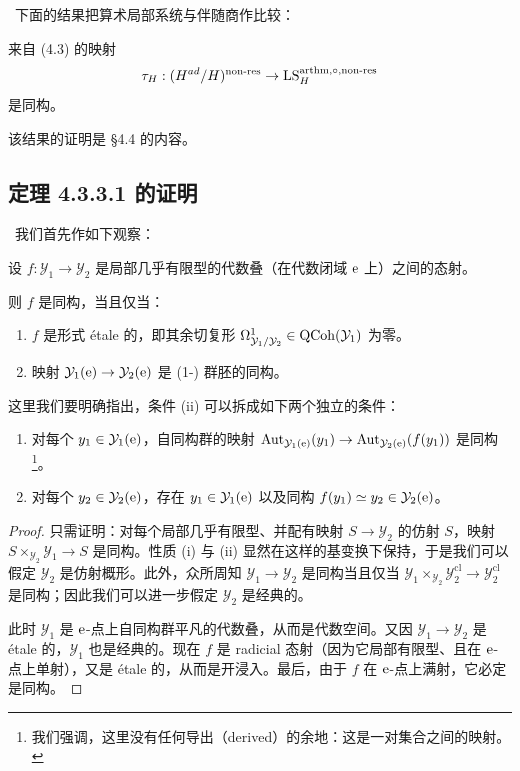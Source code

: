 \ 下面的结果把算术局部系统与伴随商作比较：

\begin{thm}
来自 (4.3) 的映射
\[
  \tau_H : (H^{ad}/H)^{\mathrm{non}\text{-}\mathrm{res}} \to \mathrm{LS}^{\mathrm{arthm},\circ,\mathrm{non}\text{-}\mathrm{res}}_H
\]
是同构。
\end{thm}

该结果的证明是 §4.4 的内容。

\subsection{定理 4.3.3.1 的证明}

\ 我们首先作如下观察：

\begin{lem}
设 $f : \mathcal{Y}_1 \to \mathcal{Y}_2$ 是局部几乎有限型的代数叠（在代数闭域 $\mathrm{e}$ 上）之间的态射。

则 $f$ 是同构，当且仅当：
\begin{enumerate}[label=(\roman*)]
  \item $f$ 是形式 étale 的，即其余切复形 $\Omega^1_{\mathcal{Y}_1/\mathcal{Y}_2} \in \mathrm{QCoh}(\mathcal{Y}_1)$ 为零。
  \item 映射 $\mathcal{Y}_1(\mathrm{e}) \to \mathcal{Y}_2(\mathrm{e})$ 是 (1-) 群胚的同构。
\end{enumerate}
这里我们要明确指出，条件 (ii) 可以拆成如下两个独立的条件：
\begin{enumerate}[label=(\text{ii}$_{\arabic*}$)]
  \item 对每个 $y_1 \in \mathcal{Y}_1(\mathrm{e})$，自同构群的映射 $\operatorname{Aut}_{\mathcal{Y}_1(\mathrm{e})}(y_1) \to \operatorname{Aut}_{\mathcal{Y}_2(\mathrm{e})}(f(y_1))$ 是同构\footnote{我们强调，这里没有任何导出（derived）的余地：这是一对集合之间的映射。}。
  \item 对每个 $y_2 \in \mathcal{Y}_2(\mathrm{e})$，存在 $y_1 \in \mathcal{Y}_1(\mathrm{e})$ 以及同构 $f(y_1) \simeq y_2 \in \mathcal{Y}_2(\mathrm{e})$。
\end{enumerate}
\end{lem}

\begin{proof}
只需证明：对每个局部几乎有限型、并配有映射 $S \to \mathcal{Y}_2$ 的仿射 $S$，映射 $S \times_{\mathcal{Y}_2} \mathcal{Y}_1 \to S$ 是同构。性质 (i) 与 (ii) 显然在这样的基变换下保持，于是我们可以假定 $\mathcal{Y}_2$ 是仿射概形。此外，众所周知 $\mathcal{Y}_1 \to \mathcal{Y}_2$ 是同构当且仅当 $\mathcal{Y}_1 \times_{\mathcal{Y}_2} \mathcal{Y}_2^{\mathrm{cl}} \to \mathcal{Y}_2^{\mathrm{cl}}$ 是同构；因此我们可以进一步假定 $\mathcal{Y}_2$ 是经典的。

此时 $\mathcal{Y}_1$ 是 $\mathrm{e}$-点上自同构群平凡的代数叠，从而是代数空间。又因 $\mathcal{Y}_1 \to \mathcal{Y}_2$ 是 étale 的，$\mathcal{Y}_1$ 也是经典的。现在 $f$ 是 radicial 态射（因为它局部有限型、且在 $\mathrm{e}$-点上单射），又是 étale 的，从而是开浸入。最后，由于 $f$ 在 $\mathrm{e}$-点上满射，它必定是同构。
\end{proof}

